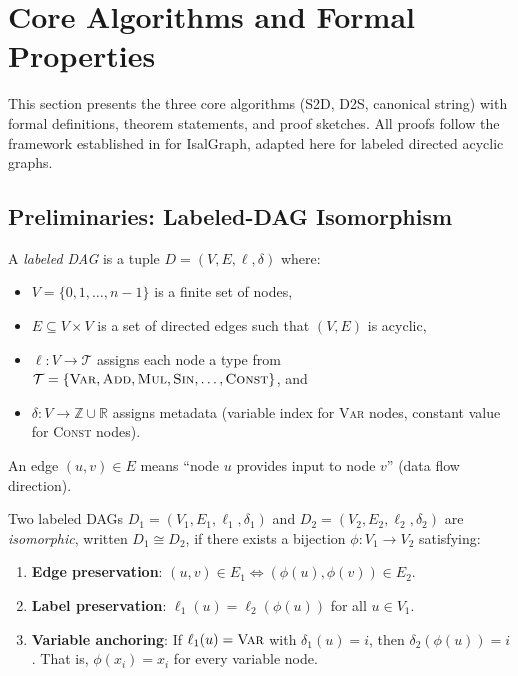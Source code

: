 \section{Core Algorithms and Formal Properties}
\label{sec:algorithms}

This section presents the three core algorithms (S2D, D2S, canonical string)
with formal definitions, theorem statements, and proof sketches. All proofs
follow the framework established in \cite{lopezrubio2025} for IsalGraph,
adapted here for labeled directed acyclic graphs.

\subsection{Preliminaries: Labeled-DAG Isomorphism}

\begin{definition}
\label{def:labeled_dag}
A \emph{labeled DAG} is a tuple $D = (V, E, \ell, \delta)$ where:
\begin{itemize}[nosep]
  \item $V = \{0, 1, \ldots, n-1\}$ is a finite set of nodes,
  \item $E \subseteq V \times V$ is a set of directed edges such that $(V, E)$ is acyclic,
  \item $\ell: V \to \mathcal{T}$ assigns each node a type from
    $\mathcal{T} = \{\textsc{Var}, \textsc{Add}, \textsc{Mul}, \textsc{Sin}, \ldots, \textsc{Const}\}$, and
  \item $\delta: V \to \mathbb{Z} \cup \mathbb{R}$ assigns metadata (variable index for \textsc{Var} nodes,
    constant value for \textsc{Const} nodes).
\end{itemize}
An edge $(u, v) \in E$ means ``node $u$ provides input to node $v$'' (data flow direction).
\end{definition}

\begin{definition}
\label{def:isomorphism}
Two labeled DAGs $D_1 = (V_1, E_1, \ell_1, \delta_1)$ and $D_2 = (V_2, E_2, \ell_2, \delta_2)$
are \emph{isomorphic}, written $D_1 \cong D_2$, if there exists a bijection $\phi: V_1 \to V_2$
satisfying:
\begin{enumerate}[nosep]
  \item \textbf{Edge preservation}: $(u, v) \in E_1 \iff (\phi(u), \phi(v)) \in E_2$.
  \item \textbf{Label preservation}: $\ell_1(u) = \ell_2(\phi(u))$ for all $u \in V_1$.
  \item \textbf{Variable anchoring}: If $\ell_1(u) = \textsc{Var}$ with $\delta_1(u) = i$,
    then $\delta_2(\phi(u)) = i$. That is, $\phi(x_i) = x_i$ for every variable node.
\end{enumerate}
\end{definition}

